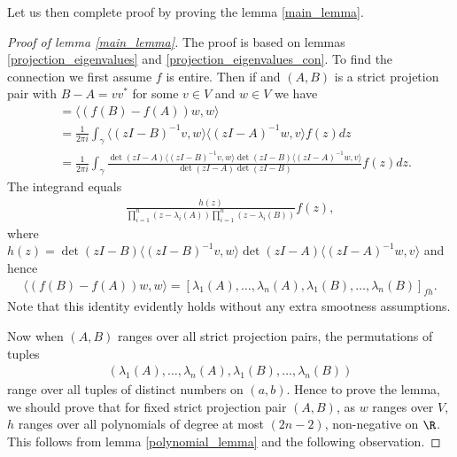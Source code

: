 Let us then complete proof by proving the lemma \ref{main_lemma}.

\begin{proof}[Proof of lemma \ref{main_lemma}]
	The proof is based on lemmas \ref{projection_eigenvalues} and \ref{projection_eigenvalues_con}. To find the connection we first assume $f$ is entire. Then if and $(A, B)$ is a strict projetion pair with $B - A = v v^{*}$ for some $v \in V$ and $w \in V$ we have
	\begin{align*}
		&= \langle (f(B) - f(A)) w, w \rangle \\
		&= \frac{1}{2 \pi i}\int_{\gamma} \langle (z I - B)^{-1} v, w \rangle  \langle (z I - A)^{-1} w, v \rangle f(z) dz \\
		&= \frac{1}{2 \pi i}\int_{\gamma} \frac{\det(z I - A)\langle (z I - B)^{-1} v, w \rangle \det(z I - B) \langle (z I - A)^{-1} w, v \rangle}{\det(z I - A) \det(z I - B)} f(z) dz.
	\end{align*}
	The integrand equals
	\begin{align*}
		\frac{h(z)}{\prod_{i = 1}^{n}(z - \lambda_{i}(A)) \prod_{i = 1}^{n}(z - \lambda_{i}(B))} f(z),
	\end{align*}
	where $h(z) = \det(z I - B)\langle (z I - B)^{-1} v, w \rangle \det(z I - A) \langle (z I - A)^{-1} w, v \rangle$ and hence
	\begin{align*}
		\langle (f(B) - f(A)) w, w \rangle = [\lambda_{1}(A), \ldots, \lambda_{n}(A), \lambda_{1}(B), \ldots, \lambda_{n}(B)]_{f h}.
	\end{align*}
	Note that this identity evidently holds without any extra smootness assumptions.

	Now when $(A, B)$ ranges over all strict projection pairs, the permutations of tuples
	\begin{align}
	(\lambda_{1}(A), \ldots, \lambda_{n}(A), \lambda_{1}(B), \ldots, \lambda_{n}(B))
	\end{align}
	range over all tuples of distinct numbers on $(a, b)$. Hence to prove the lemma, we should prove that for fixed strict projection pair $(A, B)$, as $w$ ranges over $V$, $h$ ranges over all polynomials of degree at most $(2 n - 2)$, non-negative on $\R$. This follows from lemma \ref{polynomial_lemma} and the following observation.


\end{proof}
